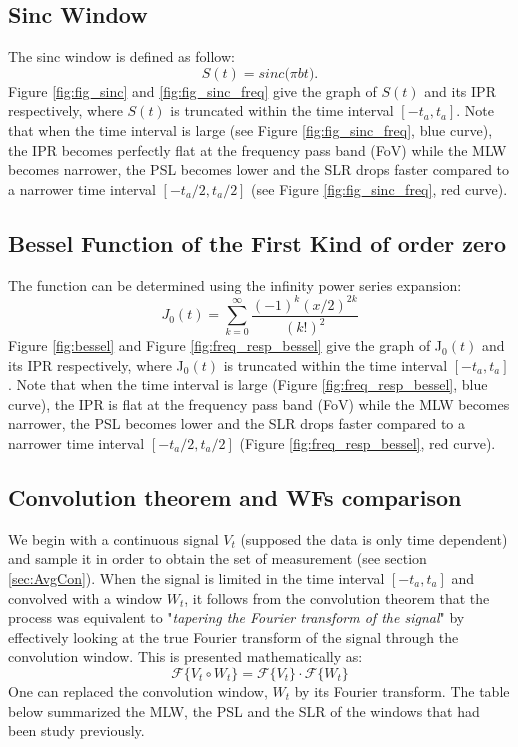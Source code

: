 \documentclass[useAMS,usenatbib]{mn2e}
\begin{document}
\subsection{Sinc Window}
The sinc window is defined as follow:
\begin{equation}
S(t)= sinc\big(\pi b t\big).
\end{equation}
 Figure \ref{fig:fig_sinc} and \ref{fig:fig_sinc_freq} give the graph of $S(t)$ and its IPR respectively, where 
$S(t)$ is truncated within the time interval $[-t_a,t_a]$. Note that when the time interval is large 
(see Figure \ref{fig:fig_sinc_freq}, blue curve), the IPR becomes perfectly flat at the frequency pass band (FoV) while the MLW becomes 
narrower,  the PSL 
becomes lower and the SLR drops faster compared to a narrower time interval $[-t_a/2,t_a/2]$ (see Figure \ref{fig:fig_sinc_freq}, red 
curve). 
\subsection{Bessel Function of the First Kind of order zero}
 The function can  be determined using the infinity power series expansion:
\begin{equation}
J_0(t) = \sum_{k=0}^{\infty}\frac{(-1)^k (x/2)^{2k}}{(k!)^2}
\end{equation}
 Figure \ref{fig:bessel} and Figure \ref{fig:freq_resp_bessel} give the graph of J$_0(t)$ and its IPR respectively, where 
J$_0(t)$ is truncated within the time interval $[-t_a,t_a]$. Note that when the time interval is large 
(Figure \ref{fig:freq_resp_bessel}, blue curve), the IPR is flat at the frequency pass band (FoV) while the MLW becomes narrower,  the PSL 
becomes lower and the SLR drops faster compared to a narrower time interval $[-t_a/2,t_a/2]$ (Figure \ref{fig:freq_resp_bessel}, red curve).
\subsection{Convolution theorem and WFs comparison}
We begin with a continuous signal $V_{t}$ (supposed the data is only time dependent) and sample it in order to obtain the set of 
measurement (see section \ref{sec:AvgCon}). When the signal is limited in the time interval $[-t_a,t_a]$ and convolved with a window 
$W_{t}$, it 
follows from the convolution theorem that the process was equivalent to "\textit{tapering the  Fourier transform of the signal}" by 
effectively looking at the true Fourier transform of the signal through the convolution window. This is presented mathematically as:
\begin{equation}
\mathcal{F}\Big\{V_{t}\circ W_{t}\Big\} = \mathcal{F}\Big\{V_{t}\Big\}\cdot \mathcal{F}\Big\{W_{t}\Big\}
\end{equation}
One can replaced the convolution window, $W_{t}$ by its Fourier transform. The table below summarized the MLW, the PSL and the SLR of the 
windows that had been study previously.\\
\end{document}
